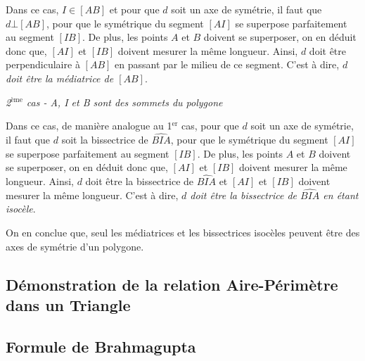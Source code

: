 \documentclass[a4paper, twoside]{article}
\begin{document}
Dans ce cas, $I \in [AB]$ et pour que $d$ soit un axe de symétrie,
il faut que $d\bot[AB]$, pour que le symétrique du segment $[AI]$ se
superpose parfaitement au segment $[IB]$.
De plus, les points $A$ et $B$ doivent se superposer,
on en déduit donc que,
$[AI]$ et $[IB]$ doivent mesurer la même longueur.
Ainsi, $d$ doit être perpendiculaire à $[AB]$ en passant par le milieu de ce segment.
C'est à dire, \emph{$d$ doit être la médiatrice de $[AB]$}.

\smallbreak

\textit{2$^{\text{ème}}$ cas - A, I et B sont des sommets du polygone}

Dans ce cas, de manière analogue au 1$^{\text{er}}$ cas,
pour que $d$ soit un axe de symétrie,
il faut que $d$ soit la bissectrice de $\widehat{BIA}$,
pour que le symétrique du segment $[AI]$ se
superpose parfaitement au segment $[IB]$.
De plus, les points $A$ et $B$ doivent se superposer,
on en déduit donc que,
$[AI]$ et $[IB]$ doivent mesurer la même longueur.
Ainsi, $d$ doit être la bissectrice de $\widehat{BIA}$ et $[AI]$ et $[IB]$ doivent mesurer la même longueur.
C'est à dire, \emph{$d$ doit être la bissectrice de $\widehat{BIA}$ en étant isocèle}.

On en conclue que, seul les médiatrices et les bissectrices isocèles peuvent être des
axes de symétrie d'un polygone.


\subsection*{Démonstration de la relation Aire-Périmètre dans un Triangle} \label{relation_aire_perim_triangle}

\subsection*{Formule de Brahmagupta} \label{formule_de_Brahmagupta}

\end{document}
